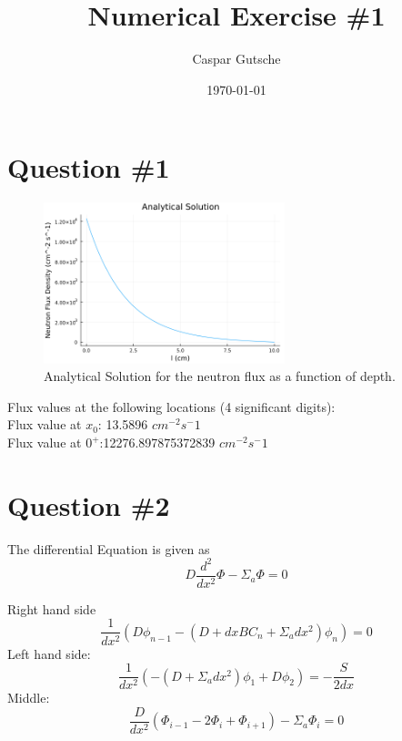 \documentclass[11pt,a4paper]{article}
\begin{document}
\title{Numerical Exercise \#1}
\author{Caspar Gutsche\\  %
}
\date{\today}
\maketitle



\newpage
\section{Question \#1}
\begin{figure}[h]
\includegraphics[width=7cm]{../figs/ex1_analytical.png}
\centering
\caption{Analytical Solution for the neutron flux as a function of depth.}
\end{figure}
Flux values at the following locations (4 significant digits):\\
Flux value at $x_0$: 13.5896 $cm^{-2} s^-1$\\
Flux value at $0^+$:12276.897875372839  $cm^{-2} s^-1$ \\


\section{Question \#2}

The differential Equation is given as
\begin{equation}
    D \frac{ d^2 }{ dx^2 } \Phi  -  \Sigma_{a}\Phi = 0
\end{equation}

Right hand side
$$
\frac{1}{dx^2} ( D \phi_{n-1} - (D + dx BC_{n} + \Sigma_{a} dx^2)\phi_{n}) = 0
$$
Left hand side:
$$
\frac{1}{dx^2}(-(D + \Sigma_{a} dx^2) \phi_{1} + D\phi_{2}) = -\frac{S}{2dx}
$$
Middle:
$$
\frac{D}{dx^2}(\Phi_{i-1} - 2 \Phi_{i} + \Phi_{i+1}) - \Sigma_{a} \Phi_{i} = 0
$$
\end{document}
